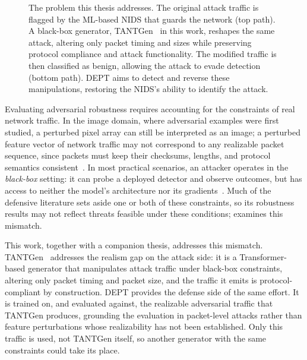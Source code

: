 \begin{figure}[htbp]
    \centering
    
    \caption[The adversarial evasion problem.]{The problem this thesis addresses. The original attack traffic is flagged by the ML-based
    NIDS that guards the network (top path). A black-box generator, TANTGen~\cite{pissarra2026tantgen} in this work,
    reshapes the same attack, altering only packet timing and sizes while preserving protocol compliance and attack functionality. The modified traffic is then classified as benign, allowing the attack to evade detection (bottom path). DEPT aims to detect and reverse these manipulations, restoring the NIDS's ability to identify the attack.}
    \label{fig:intro-evasion}
\end{figure}

Evaluating adversarial robustness requires accounting for the constraints of real network traffic.
In the image
domain, where adversarial examples were first studied, a perturbed pixel array can still be interpreted as an image; a perturbed feature vector of network traffic may not correspond to any realizable packet sequence, since packets must
keep their checksums, lengths, and protocol semantics
consistent~\cite{pierazzi2020intriguing,hashemi2019towards}. 
In most practical scenarios, an attacker operates in the \emph{black-box} setting: it can probe a deployed detector and observe
outcomes, but has access to neither the model's architecture nor its
gradients~\cite{papernot2017practical,apruzzese2023sok}. Much of the defensive literature
sets aside one or both of these constraints, so its robustness results may not reflect threats feasible under these conditions;  examines this mismatch.

This work, together with a companion thesis, addresses this mismatch.
TANTGen~\cite{pissarra2026tantgen}
addresses the realism gap on the attack side: it is a Transformer-based generator that
manipulates attack traffic under black-box constraints, altering only packet timing
and packet size, and the traffic it emits is protocol-compliant by construction. DEPT provides
the defense side of the same effort. It is trained on, and evaluated against, the
realizable adversarial traffic that TANTGen produces, grounding the evaluation in packet-level attacks rather than feature perturbations whose realizability has not been established.
Only this traffic is used, not TANTGen itself, so another generator with the same constraints
could take its place.


